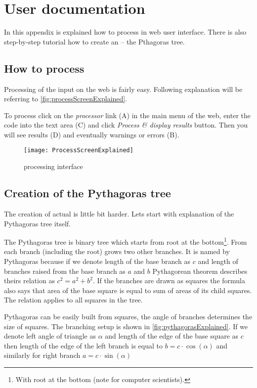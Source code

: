 

\chapter{User documentation}
\label{chap:userDoc}

In this appendix is explained how to process \lsystems in web user interface.
There is also step-by-step tutorial how to create an \lsystem -- the Pthagoras tree.

\section{How to process \lsystem}

Processing of the input on the web is fairly easy.
Following explanation will be referring to \autoref{fig:processScreenExplained}.

To process \lsystem click on the \emph{\lsystem processor} link (A) in the main menu of the web, enter the \lsystem code into the text area (C) and click \emph{Process \& display results} button.
Then you will see results (D) and eventually warnings or errors (B).

\begin{figure}[p]
	\centering
	\texttt{[image: ProcessScreenExplained]}
	\caption{\lsystem processing interface}
	\label{fig:processScreenExplained}
\end{figure}


\section{Creation of the Pythagoras tree}

The creation of actual \lsystem is little bit harder.
Lets start with explanation of the Pythagoras tree itself.

The Pythagoras tree is binary tree which starts from root at the bottom\footnote{With root at the bottom (note for computer scientists).}.
From each branch (including the root) grows two other branches.
It is named by Pythagoras because if we denote length of the base branch as $c$ and length of branches raised from the base branch as $a$ and $b$ Pythagorean theorem describes theirs relation as $c^2 = a^2 + b^2$.
If the branches are drawn as squares the formula also says that area of the base square is equal to sum of areas of its child squares.
The relation applies to all squares in the tree.

Pythagoras can be easily built from squares, the angle of branches determines the size of squares.
The branching setup is shown in \autoref{fig:pythagorasExplained}.
If we denote left angle of triangle as $\alpha$ and length of the edge of the base square as $c$ then length of the edge of the left branch is equal to $b = c \cdot \cos(\alpha)$ and similarly for right branch  $a = c \cdot \sin(\alpha)$

